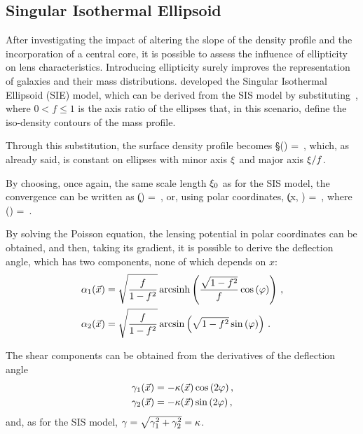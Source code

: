 \subsection{Singular Isothermal Ellipsoid}
\label{subsec:sie}
After investigating the impact of altering the slope of the density profile and the incorporation of a central core, it is possible to assess the influence of ellipticity on lens characteristics. Introducing ellipticity surely improves the representation of galaxies and their mass distributions. \cite{kormann_isothermal_1994} developed the Singular Isothermal Ellipsoid (SIE) model, which can be derived from the SIS model by substituting
\be
\label{eq:3.33}
\x \quad \Rightarrow \quad {} \,,
\ee
where $0 < f \leq 1$ is the axis ratio of the ellipses that, in this scenario, define the iso-density contours of the mass profile.

Through this substitution, the surface density profile becomes
\be
\label{eq:3.34}
\S (\va{\x}) =    \,,
\ee
which, as already said, is constant on ellipses with minor axis $\xi$ and major axis $\xi / f$.

By choosing, once again, the same scale length $\xi_0$ as for the SIS model, the convergence can be written as
\be
\label{eq:3.35}
\k () =   \,,
\ee
or, using polar coordinates,
\be
\label{eq:3.36}
\k (x, \varphi) =   \,,
\ee
where
\be
\label{eq:3.37}
\D (\varphi) =   \,.
\ee

By solving the Poisson equation, the lensing potential in polar coordinates can be obtained, and then, taking its gradient, it is possible to derive the deflection angle, which has two components, none of which depends on $x$:
\begin{equation}
\begin{aligned}
    \label{eq:3.38}
    \alpha_1 (\vec{x}) & = \sqrt{\frac{f}{1 - f^2}} \operatorname{arcsinh} \left( \frac{\sqrt{1 - f^2}}{f} \cos{(\varphi)} \right) \,,
    \\
    \alpha_2 (\vec{x}) & = \sqrt{\frac{f}{1 - f^2}} \arcsin \left( \sqrt{1 - f^2} \sin{(\varphi)} \right) \,.
\end{aligned}
\end{equation}

The shear components can be obtained from the derivatives of the deflection angle
\begin{equation}
\begin{aligned}
    \label{eq:3.39}
    \gamma_1 (\vec{x}) & = - \kappa (\vec{x}) \cos{(2 \varphi)} \,,
    \\
    \gamma_2 (\vec{x}) & = - \kappa (\vec{x}) \sin{(2 \varphi)} \,,
\end{aligned}
\end{equation}
and, as for the SIS model, $\gamma = \sqrt{\gamma_1^2 + \gamma_2^2} = \kappa$.

